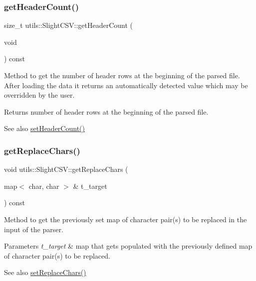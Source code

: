\subsubsection{\texorpdfstring{get\+Header\+Count()}{getHeaderCount()}}
{\footnotesize\ttfamily size\+\_\+t utils\+::\+Slight\+C\+S\+V\+::get\+Header\+Count (\begin{DoxyParamCaption}\item[{void}]{ }\end{DoxyParamCaption}) const}

Method to get the number of header rows at the beginning of the parsed file. After loading the data it returns an automatically detected value which may be overridden by the user. \begin{DoxyReturn}{Returns}
number of header rows at the beginning of the parsed file. 
\end{DoxyReturn}
\begin{DoxySeeAlso}{See also}
\hyperlink{classutils_1_1SlightCSV_a3d704d8bbce22b1731e383db4fc96429}{set\+Header\+Count()} 
\end{DoxySeeAlso}
\mbox{\label{classutils_1_1SlightCSV_aa28076f9867ef095802adbe0d8f966fb}} 
\subsubsection{\texorpdfstring{get\+Replace\+Chars()}{getReplaceChars()}}
{\footnotesize\ttfamily void utils\+::\+Slight\+C\+S\+V\+::get\+Replace\+Chars (\begin{DoxyParamCaption}\item[{map$<$ char, char $>$ \&}]{t\+\_\+target }\end{DoxyParamCaption}) const}

Method to get the previously set map of character pair(s) to be replaced in the input of the parser. 
\begin{DoxyParams}{Parameters}
{\em t\+\_\+target} & map that gets populated with the previously defined map of character pair(s) to be replaced. \\
\hline
\end{DoxyParams}
\begin{DoxySeeAlso}{See also}
\hyperlink{classutils_1_1SlightCSV_a9f7c4e3d88da03440d01b926b1fc3447}{set\+Replace\+Chars()} 
\end{DoxySeeAlso}
\mbox{\label{classutils_1_1SlightCSV_ad4b0243488827303cd22d5efd41d96b6}} 
